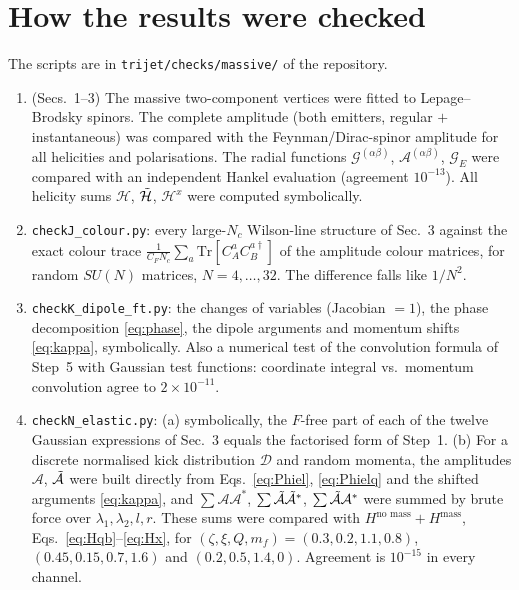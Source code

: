 \documentclass[9pt]{article}
\numberwithin{equation}{section}
\begin{document}
\section{How the results were checked}\label{app:checks4}
The scripts are in \texttt{trijet/checks/massive/} of the repository.
\begin{enumerate}
    \item[E--I] (Secs.~1--3) The massive two-component vertices were fitted to Lepage--Brodsky spinors. The complete amplitude (both emitters, regular $+$ instantaneous) was compared with the Feynman/Dirac-spinor amplitude for all helicities and polarisations. The radial functions $\mathcal{G}^{(\alpha\beta)}$, $\mathcal{A}^{(\alpha\beta)}$, $\mathcal{G}_{E}$ were compared with an independent Hankel evaluation (agreement $10^{-13}$). All helicity sums $\mathcal{H}$, $\Tilde{\mathcal{H}}$, $\mathcal{H}^{x}$ were computed symbolically.
    \item[J] \texttt{checkJ\_colour.py}: every large-$N_{c}$ Wilson-line structure of Sec.~3 against the exact colour trace $\frac{1}{C_{F}N_{c}}\sum_{a}\text{Tr}[C^{a}_{A}C^{a\dagger}_{B}]$ of the amplitude colour matrices, for random $SU(N)$ matrices, $N=4,\ldots,32$. The difference falls like $1/N^{2}$.
    \item[K] \texttt{checkK\_dipole\_ft.py}: the changes of variables (Jacobian $=1$), the phase decomposition \eqref{eq:phase}, the dipole arguments and momentum shifts \eqref{eq:kappa}, symbolically. Also a numerical test of the convolution formula of Step~5 with Gaussian test functions: coordinate integral vs.\ momentum convolution agree to $2\times10^{-11}$.
    \item[N] \texttt{checkN\_elastic.py}: (a) symbolically, the $F$-free part of each of the twelve Gaussian expressions of Sec.~3 equals the factorised form of Step~1. (b) For a discrete normalised kick distribution $\mathcal{D}$ and random momenta, the amplitudes $\mathcal{A}$, $\Tilde{\mathcal{A}}$ were built directly from Eqs.~\eqref{eq:Phiel}, \eqref{eq:Phielq} and the shifted arguments \eqref{eq:kappa}, and $\sum\mathcal{A}\mathcal{A}^{*}$, $\sum\Tilde{\mathcal{A}}\Tilde{\mathcal{A}}^{*}$, $\sum\Tilde{\mathcal{A}}\mathcal{A}^{*}$ were summed by brute force over $\lambda_{1},\lambda_{2},l,r$. These sums were compared with $H^{\text{no mass}}+H^{\text{mass}}$, Eqs.~\eqref{eq:Hqb}--\eqref{eq:Hx}, for $(\zeta,\xi,Q,m_{f})=(0.3,0.2,1.1,0.8)$, $(0.45,0.15,0.7,1.6)$ and $(0.2,0.5,1.4,0)$. Agreement is $10^{-15}$ in every channel.
\end{enumerate}
\end{document}
